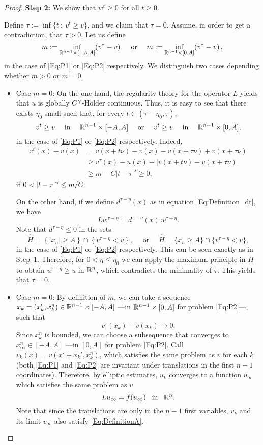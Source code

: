 \begin{proof}
\textbf{Step 2:} We show that $w^t\geq 0$ for all $t\geq 0$.

Define $\tau := \inf \{t \ : \ v^t\geq v\}$, and we claim that $\tau=0$. Assume, in order to get a contradiction, that $\tau>0$. Let us define
$$ 
m := \inf_{\mathbb{R}^{n-1}\times [-A,A]} (v^\tau - v)\, \quad \text{ or } \quad
m := \inf_{\mathbb{R}^{n-1}\times [0,A]} (v^\tau - v) \,,
$$
in the case of \eqref{Eq:P1} or \eqref{Eq:P2} respectively. We distinguish two cases depending whether $m>0$ or $m=0$.
\begin{itemize}
\item Case $m=0$:
On the one hand, the regularity theory for the operator $L$ yields that $u$ is globally $C^\gamma$-H\"older continuous. Thus, it is easy to see that there exists $\eta_0$ small such that, for every  $t\in(\tau-\eta_0,\tau)$,
$$ 
v^t\geq v \quad \textrm{ in } \quad  \mathbb{R}^{n-1}\times [-A,A] 
\quad \text{ or } \quad  
v^t\geq v \quad \textrm{ in } \quad  \mathbb{R}^{n-1}\times [0,A], 
$$
in the case of \eqref{Eq:P1} or \eqref{Eq:P2} respectively. Indeed,
\begin{align*}
v^t(x)-v(x) &= v(x+t\nu)-v(x)-v(x+\tau\nu)+v(x+\tau\nu) \\
& \geq v^\tau(x)-u(x) - |v(x+t\nu)-v(x+\tau\nu)| \\
& \geq m - C|t-\tau|^s \geq 0,
\end{align*}
if $0 < |t-\tau|^\gamma\leq m/C$.

On the other hand, if we define $d^{\tau-\eta}(x)$ as in equation \eqref{Eq:Definition_dt}, we have
$$ L w^{\tau-\eta} = d^{\tau-\eta} (x) \,w^{\tau-\eta}. $$
Note that $d^{\tau-\eta}\leq 0$ in the sets
$$ 
\hat{H} = \left\{|x_n|\geq A\right\} \cap \left\{v^{\tau-\eta}<v\right\},   \quad  \textrm{ or }  \quad  
\hat{H} = \{x_n\geq A\} \cap \{v^{\tau-\eta}<v\},
$$
in the case of \eqref{Eq:P1} or \eqref{Eq:P2} respectively. This can be seen exactly as in Step~1. Therefore, for $0<\eta \leq \eta_0$ we can apply the maximum principle in $\tilde{H}$ to obtain $u^{\tau-\eta} \geq u$ in $\mathbb{R}^n$, which contradicts the minimality of $\tau$. This yields that $\tau = 0$.

\item Case $m=0$: By definition of $m$, we can take a sequence $x_k= (x_k',x_k^n) \in \mathbb{R}^{n-1}\times[-A,A]$ ---in $\mathbb{R}^{n-1}\times[0,A]$ for problem \eqref{Eq:P2}---, such that
\begin{equation}
\label{Eq:Limit}
v^\tau(x_k) - v(x_k) \rightarrow 0.
\end{equation}
Since $x_k^n$ is bounded, we can choose a subsequence that converges to $x_\infty^n \in [-A,A]$ ---in $[0,A]$ for problem \eqref{Eq:P2}.
Call $v_k(x) = v(x'+x_k',x_k^n)$, which satisfies the same problem as $v$ for each $k$ (both \eqref{Eq:P1} and \eqref{Eq:P2} are invariant under translations in the first $n-1$ coordinates). Therefore, by elliptic estimates, $u_k$ converges to a function $u_\infty$ which satisfies the same problem as $v$ 
$$ L u_\infty = f(u_\infty) \,\,\, \text{ in } \,\,\, \mathbb{R}^n. $$
Note that since the translations are only in the $n-1$ first variables, $v_k$ and its limit $v_\infty$ also satisfy \eqref{Eq:DefinitionA}. 


\end{itemize}
\end{proof}
